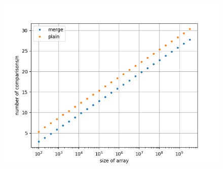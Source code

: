 \documentclass[14pt]{extarticle}
\begin{document}
\begin{figure}[H]
	\centering
	\includegraphics[scale=1]{Figure_2}
\end{figure}
\end{document}
